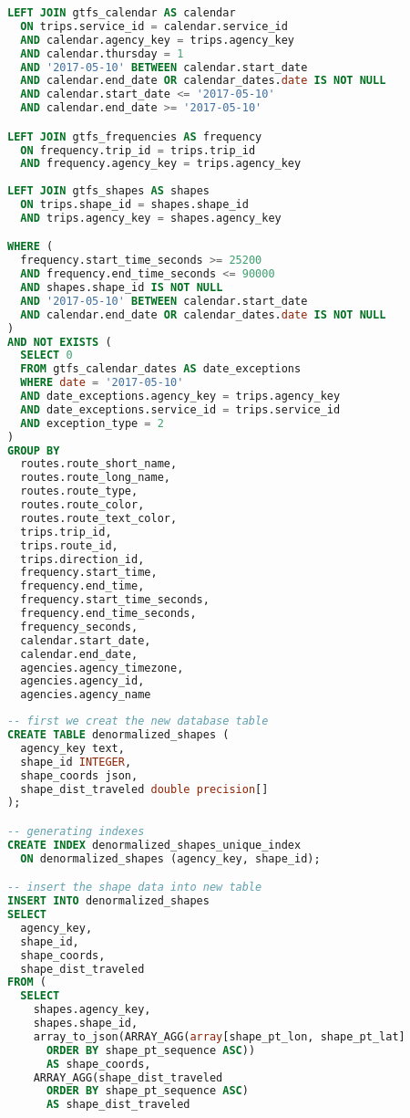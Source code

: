 \begin{newpage}
\begin{lstlisting}[captionpos=t, caption=Postgresql Datenbankabfrage von allen aktiven Trips mit ihrem dazugehörigen Linienverlauf, label=lst:get_active_trips_query, language=SQL]
LEFT JOIN gtfs_calendar AS calendar 
  ON trips.service_id = calendar.service_id
  AND calendar.agency_key = trips.agency_key
  AND calendar.thursday = 1
  AND '2017-05-10' BETWEEN calendar.start_date 
  AND calendar.end_date OR calendar_dates.date IS NOT NULL
  AND calendar.start_date <= '2017-05-10'
  AND calendar.end_date >= '2017-05-10'

LEFT JOIN gtfs_frequencies AS frequency
  ON frequency.trip_id = trips.trip_id
  AND frequency.agency_key = trips.agency_key
    
LEFT JOIN gtfs_shapes AS shapes
  ON trips.shape_id = shapes.shape_id
  AND trips.agency_key = shapes.agency_key

WHERE (
  frequency.start_time_seconds >= 25200 
  AND frequency.end_time_seconds <= 90000
  AND shapes.shape_id IS NOT NULL
  AND '2017-05-10' BETWEEN calendar.start_date 
  AND calendar.end_date OR calendar_dates.date IS NOT NULL
) 
AND NOT EXISTS (
  SELECT 0
  FROM gtfs_calendar_dates AS date_exceptions
  WHERE date = '2017-05-10'
  AND date_exceptions.agency_key = trips.agency_key
  AND date_exceptions.service_id = trips.service_id
  AND exception_type = 2
)
GROUP BY 
  routes.route_short_name,
  routes.route_long_name,
  routes.route_type,
  routes.route_color,
  routes.route_text_color,
  trips.trip_id, 
  trips.route_id,
  trips.direction_id,
  frequency.start_time, 
  frequency.end_time, 
  frequency.start_time_seconds,
  frequency.end_time_seconds,
  frequency_seconds,
  calendar.start_date,
  calendar.end_date,
  agencies.agency_timezone,
  agencies.agency_id,
  agencies.agency_name
\end{lstlisting}


\begin{lstlisting}[captionpos=t, caption=Erstellen einer denormalized\_shapes Tabelle, label=lst:sql_aggregate_shape, language=SQL]
-- first we creat the new database table
CREATE TABLE denormalized_shapes (
  agency_key text,
  shape_id INTEGER,
  shape_coords json,
  shape_dist_traveled double precision[]
);

-- generating indexes
CREATE INDEX denormalized_shapes_unique_index 
  ON denormalized_shapes (agency_key, shape_id);

-- insert the shape data into new table
INSERT INTO denormalized_shapes
SELECT
  agency_key,
  shape_id,
  shape_coords,
  shape_dist_traveled
FROM (
  SELECT
    shapes.agency_key,
    shapes.shape_id,
    array_to_json(ARRAY_AGG(array[shape_pt_lon, shape_pt_lat]
      ORDER BY shape_pt_sequence ASC))
      AS shape_coords,
    ARRAY_AGG(shape_dist_traveled
      ORDER BY shape_pt_sequence ASC)
      AS shape_dist_traveled


\end{lstlisting}
\end{newpage}
